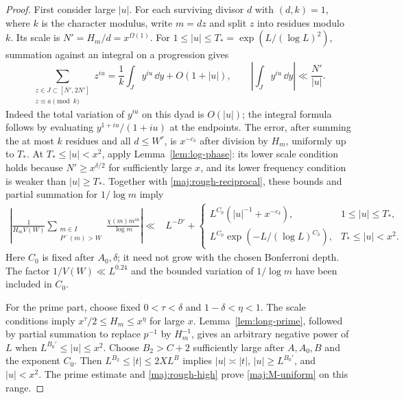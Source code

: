 \begin{proof}
First consider large $|u|$.  For each surviving divisor $d$ with
$(d,k)=1$, where $k$ is the character modulus, write $m=dz$ and
split $z$ into residues modulo $k$.  Its scale is
$N'=H_m/d=x^{\Omega(1)}$.  For
$1\le |u|\le T_*=\exp(L/(\log L)^2)$, summation against an integral
on a progression gives
\begin{equation}\label{maj:phase-elementary}
 \sum_{\substack{z\in J\subset[N',2N']\\z\equiv a\pmod k}}z^{iu}
  =\frac1k\int_J y^{iu}\,\dd y+O(1+|u|),
 \qquad
 \left|\int_Jy^{iu}\,\dd y\right|\ll\frac{N'}{|u|}.
\end{equation}
Indeed the total variation of $y^{iu}$ on this dyad is $O(|u|)$;
the integral formula follows by evaluating $y^{1+iu}/(1+iu)$ at
the endpoints.  The error, after summing the at most $k$ residues
and all $d\le W^r$, is $x^{-c_\delta}$ after division by $H_m$,
uniformly up to $T_*$.  At $T_*\le |u|<x^2$, apply
Lemma~\ref{lem:log-phase}: its lower scale condition holds because
$N'\ge x^{\delta/2}$ for sufficiently large $x$, and its lower
frequency condition is weaker than $|u|\ge T_*$.  Together with
\eqref{maj:rough-reciprocal}, these bounds and partial summation
for $1/\log m$ imply
\begin{equation}\label{maj:rough-high}
 \begin{split}
 \left|\frac1{H_mV(W)}
       \sum_{\substack{m\in I\\P^-(m)>W}}
       \frac{\chi(m)m^{iu}}{\log m}\right|
 \ll{}& L^{-D'}+
 \begin{cases}
 L^{C_0}(|u|^{-1}+x^{-c_\delta}),&1\le |u|\le T_*,\\
 L^{C_0}\exp(-L/(\log L)^{C_3}),&T_*\le |u|<x^2.
 \end{cases}
 \end{split}
\end{equation}
Here $C_0$ is fixed after $A_0,\delta$; it need not grow with the
chosen Bonferroni depth.  The factor $1/V(W)\ll L^{0.24}$ and the
bounded variation of $1/\log m$ have been included in $C_0$.

For the prime part, choose fixed $0<\tau<\delta$ and
$1-\delta<\eta<1$.  The scale conditions imply
$x^\tau/2\le H_m\le x^\eta$ for large $x$.
Lemma~\ref{lem:long-prime}, followed by partial summation to replace
$p^{-1}$ by $H_m^{-1}$, gives an arbitrary negative power of $L$
when $L^{B_0'}\le |u|\le x^2$.  Choose $B_2>C+2$ sufficiently
large after $A,A_0,B$ and the exponent $C_0$.  Then
$L^{B_2}\le |t|\le2XL^B$ implies
$|u|\asymp|t|$, $|u|\ge L^{B_0'}$, and $|u|<x^2$.
The prime estimate and \eqref{maj:rough-high} prove
\eqref{maj:M-uniform} on this range.


\end{proof}
